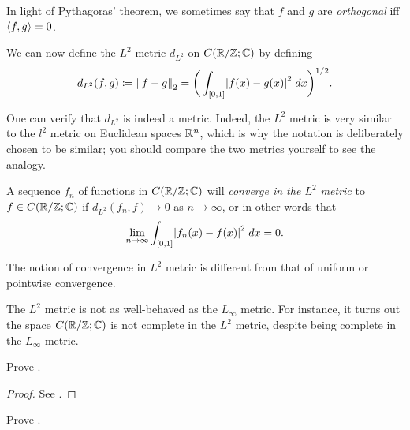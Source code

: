 \begin{note}
  In light of Pythagoras' theorem, we sometimes say that \(f\) and \(g\) are \emph{orthogonal} iff \(\inner*{f, g} = 0\).
\end{note}

\begin{ac}\label{ii:ac:5.2.2}
  We can now define the \(L^2\) metric \(d_{L^2}\) on \(C(\R / \Z ; \C)\) by defining
  \[
    d_{L^2}(f, g) \coloneqq \norm*{f - g}_2 = \bigg(\int_{[0, 1]} \abs{f(x) - g(x)}^2 \; dx\bigg)^{1 / 2}.
  \]
\end{ac}

\begin{rmk}\label{ii:5.2.8}
  One can verify that \(d_{L^2}\) is indeed a metric.
  Indeed, the \(L^2\) metric is very similar to the \(l^2\) metric on Euclidean spaces \(\R^n\), which is why the notation is deliberately chosen to be similar;
  you should compare the two metrics yourself to see the analogy.
\end{rmk}

\begin{note}
  A sequence \(f_n\) of functions in \(C(\R / \Z ; \C)\) will \emph{converge in the \(L^2\) metric} to \(f \in C(\R / \Z ; \C)\) if \(d_{L^2}(f_n, f) \to 0\) as \(n \to \infty\), or in other words that
  \[
    \lim_{n \to \infty} \int_{[0, 1]} \abs{f_n(x) - f(x)}^2 \; dx = 0.
  \]
\end{note}

\begin{rmk}\label{ii:5.2.9}
  The notion of convergence in \(L^2\) metric is different from that of uniform or pointwise convergence.
\end{rmk}

\begin{rmk}\label{ii:5.2.10}
  The \(L^2\) metric is not as well-behaved as the \(L_\infty\) metric.
  For instance, it turns out the space \(C(\R / \Z ; \C)\) is not complete in the \(L^2\) metric, despite being complete in the \(L_\infty\) metric.
\end{rmk}

\exercisesection

\begin{ex}\label{ii:ex:5.2.1}
  Prove .
\end{ex}

\begin{proof}
  See .
\end{proof}

\begin{ex}\label{ii:ex:5.2.2}
  Prove .
\end{ex}

